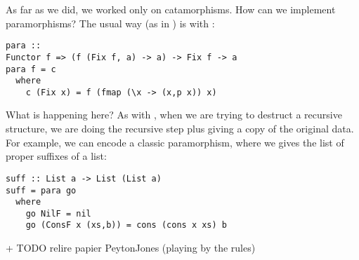 
As far as we did, we worked only on catamorphisms. How can we implement paramorphisms?
The usual way (as in \cite{ekmett:eschems}) is with :
\begin{verbatim}
para ::
Functor f => (f (Fix f, a) -> a) -> Fix f -> a
para f = c
  where
    c (Fix x) = f (fmap (\x -> (x,p x)) x)
\end{verbatim}

What is happening here? As with , when we are trying to destruct a recursive structure, we are doing the recursive step plus giving a copy of the original data.
For example, we can encode a classic paramorphism, where we gives the list of proper suffixes of a list:
\begin{verbatim}
suff :: List a -> List (List a)
suff = para go
  where
    go NilF = nil
    go (ConsF x (xs,b)) = cons (cons x xs) b
\end{verbatim}



+ TODO relire papier PeytonJones (playing by the rules)